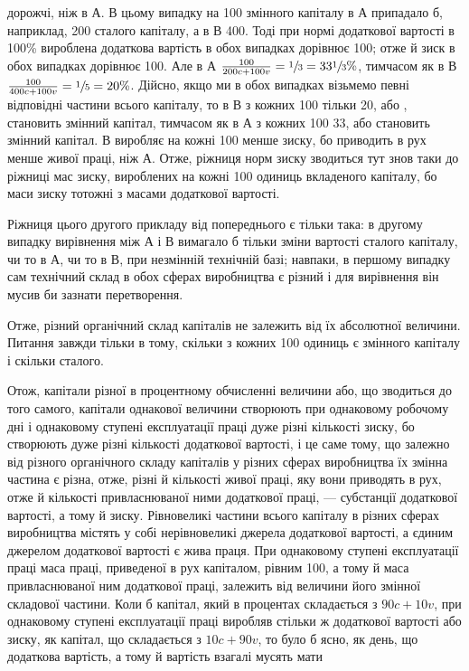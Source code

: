 \parcont{}  %
дорожчі, ніж в $А$. В цьому випадку на 100
змінного капіталу в $А$ припадало б, наприклад, 200 сталого капіталу, а в $В$ 400. Тоді при нормі додаткової вартості в 100\% вироблена
додаткова вартість в обох випадках дорівнює 100; отже й зиск в обох випадках
дорівнює 100. Але в $А$ $\frac{100}{200 c + 100 v} =
\sfrac{1}{3} = 33\sfrac{1}{3}\%$, тимчасом як в $В$ $\frac{100}{400 c + 100 v }= \sfrac{1}{5}=20\%$. Дійсно,
якщо ми в обох випадках візьмемо певні відповідні частини
всього капіталу, то в $В$ з кожних 100 тільки
20, або , становить змінний капітал, тимчасом як в $А$ з кожних 100 33, або  становить змінний капітал. $В$ виробляє на кожні 100 менше зиску, бо приводить в рух менше
живої праці, ніж $А$. Отже, ріжниця норм зиску зводиться тут
знов таки до ріжниці мас зиску, вироблених на кожні 100 одиниць вкладеного капіталу, бо маси зиску
тотожні з масами додаткової вартості.

Ріжниця цього другого прикладу від попереднього є тільки
така: в другому випадку вирівнення між $А$ і $В$ вимагало б тільки
зміни вартості сталого капіталу, чи то в $А$, чи то в $В$, при незмінній технічній базі; навпаки, в
першому випадку сам технічний склад в обох сферах виробництва є різний і для вирівнення він мусив би
зазнати перетворення.

Отже, різний органічний склад капіталів не залежить від їх
абсолютної величини. Питання завжди тільки в тому, скільки
з кожних 100 одиниць є змінного капіталу і скільки сталого.

Отож, капітали різної в процентному обчисленні величини
або, що зводиться до того самого, капітали однакової величини
створюють при однаковому робочому дні і однаковому ступені
експлуатації праці дуже різні кількості зиску, бо створюють
дуже різні кількості додаткової вартості, і це саме тому, що
залежно від різного органічного складу капіталів у різних сферах виробництва їх змінна частина є
різна, отже, різні й кількості живої праці, яку вони приводять в рух, отже й кількості
привласнюваної ними додаткової праці, — субстанції додаткової
вартості, а тому й зиску. Рівновеликі частини всього капіталу
в різних сферах виробництва містять у собі нерівновеликі джерела додаткової вартості, а єдиним
джерелом додаткової вартості є жива праця. При однаковому ступені експлуатації праці маса праці,
приведеної в рух капіталом, рівним 100, а тому й
маса привласнюваної ним додаткової праці, залежить від величини
його змінної складової частини. Коли б капітал, який в процентах складається з $90 c + 10 v$, при
однаковому ступені експлуатації праці виробляв стільки ж додаткової вартості або зиску, як капітал,
що складається з $10 c + 90 v$, то було б ясно, як день,
що додаткова вартість, а тому й вартість взагалі мусять мати
\parbreak{}  %

